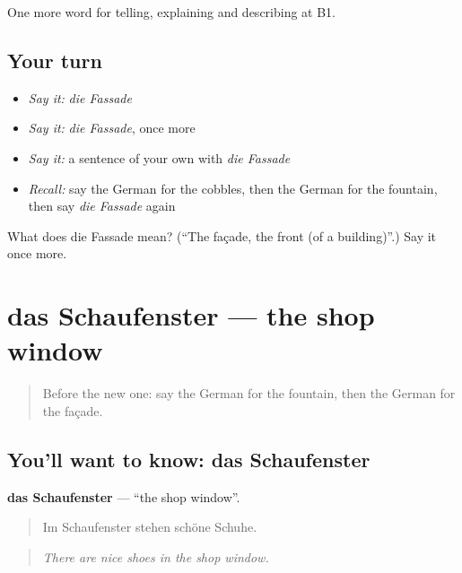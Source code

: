\begin{grammarlens}[title={What you've built}]
One more word for telling, explaining and describing at B1.
\end{grammarlens}

\subsection*{Your turn}
\begin{itemize}
\raggedright
  \item \emph{Say it:} \emph{die Fassade}
  \item \emph{Say it:} \emph{die Fassade}, once more
  \item \emph{Say it:} a sentence of your own with \emph{die Fassade}
  \item \emph{Recall:} say the German for the cobbles, then the German for the fountain, then say \emph{die Fassade} again
\end{itemize}

\begin{tcolorbox}[breakable,colback=teal!4,colframe=teal!35!black,title={Before you move on}]
What does die Fassade mean? (\textquotedblleft{}The façade, the front (of a building)\textquotedblright{}.) Say it once more.
\end{tcolorbox}
\section[das Schaufenster]{das Schaufenster — the shop window}

\label{lesson:GE-C441-schaufenster}



\begin{quote}
Before the new one: say the German for the fountain, then the German for the façade.
\end{quote}

\subsection*{You'll want to know: das Schaufenster}
\textbf{das Schaufenster} — \textquotedblleft{}the shop window\textquotedblright{}.

\begin{quote}
Im Schaufenster stehen schöne Schuhe.
\end{quote}

\begin{quote}
\emph{There are nice shoes in the shop window.}
\end{quote}

